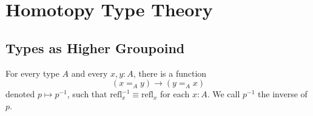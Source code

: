 %
%
%
\chapter{Homotopy Type Theory}
\label{homotypes} %

\section{Types as Higher Groupoind}

\begin{lemma}
    For every type $A$ and every $x,y:A$, there is a function $$(x=_Ay)\rightarrow (y=_Ax)$$
    denoted $p\mapsto p^{-1}$, such that $\text{refl}_x^{-1}\equiv \text{refl}_x$ for each $x:A$. We call $p^{-1}$ the inverse of $p$.
\end{lemma}
